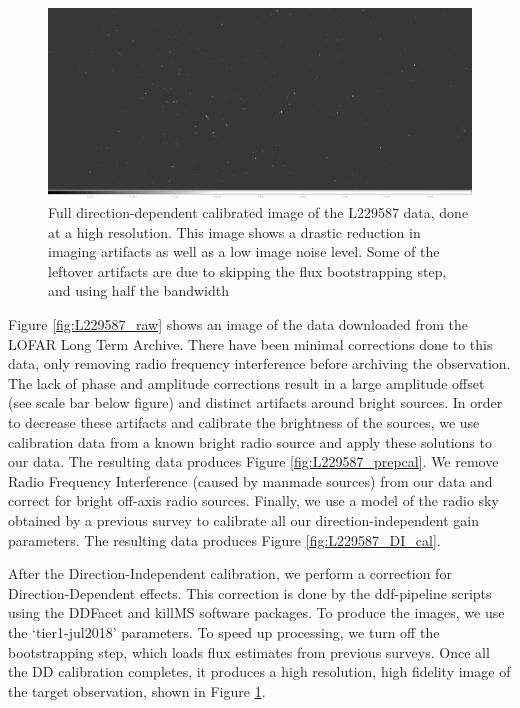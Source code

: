 \begin{figure}[!htb]
    \centering
    \includegraphics[width=.8\linewidth]{background/figures/full_ampphase_brighter.jpeg}
    \caption[Fully calibrated image]{Full direction-dependent calibrated image of the L229587 data, done at a high resolution. This image shows a drastic reduction in imaging artifacts as well as a low image noise level. Some of the leftover artifacts are due to skipping the flux bootstrapping step, and using half the bandwidth}
    \label{fig:L229587_full_high}
\end{figure}

%


Figure \ref{fig:L229587_raw} shows an image of the data downloaded from the LOFAR Long Term Archive. There have been minimal corrections done to this data, only removing radio frequency interference before archiving the observation. The lack of phase and amplitude corrections result in a large amplitude offset (see scale bar below figure) and distinct artifacts around bright sources. In order to decrease these artifacts and calibrate the brightness of the sources, we use calibration data from a known bright radio source and apply these solutions to our data.  The resulting data produces Figure \ref{fig:L229587_prepcal}. We remove Radio Frequency Interference (caused by manmade sources) from our data and correct for bright off-axis radio sources. Finally, we use a model of the radio sky obtained by a previous survey to calibrate all our direction-independent gain parameters. The resulting data produces Figure \ref{fig:L229587_DI_cal}.

After the Direction-Independent calibration, we perform a correction for Direction-Dependent effects. This correction is done by the ddf-pipeline scripts using the DDFacet and killMS software packages. To produce the images, we use the `tier1-jul2018' parameters. To speed up processing, we turn off the bootstrapping step, which loads flux estimates from previous surveys\citep{hardcastle2016}. Once all the DD calibration completes, it produces a high resolution, high fidelity image of the target observation, shown in Figure \ref{fig:L229587_full_high}.

